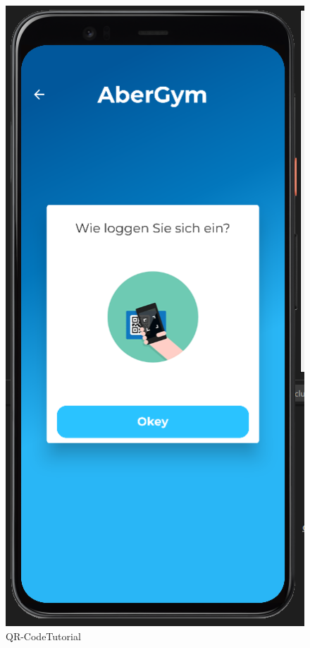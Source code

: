 \begin{figure}[H]
    \centering
    \includegraphics[scale=0.3]{pics/QRCodetutorial.png}
    \caption{QR-CodeTutorial}
\end{figure}
